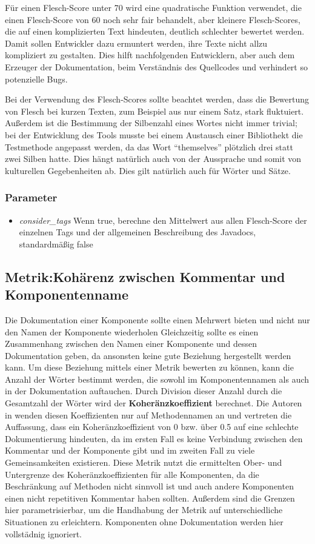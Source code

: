 Für einen Flesch-Score unter 70 wird eine quadratische Funktion verwendet, die einen Flesch-Score von 60 noch sehr fair behandelt, aber kleinere Flesch-Scores, die auf einen komplizierten Text hindeuten, deutlich schlechter bewertet werden. Damit sollen Entwickler dazu ermuntert werden, ihre Texte nicht allzu kompliziert zu gestalten. Dies hilft nachfolgenden Entwicklern, aber auch dem Erzeuger der Dokumentation, beim Verständnis des Quellcodes und verhindert so potenzielle Bugs.

Bei der Verwendung des Flesch-Scores sollte beachtet werden, dass die Bewertung von Flesch bei kurzen Texten, zum Beispiel aus nur einem Satz, stark fluktuiert. Außerdem ist die Bestimmung der Silbenzahl eines Wortes nicht immer trivial; bei der Entwicklung des Tools musste bei einem Austausch einer Bibliothekt die Testmethode angepasst werden, da das Wort \enquote{themselves} plötzlich drei statt zwei Silben hatte. Dies hängt natürlich auch von der Aussprache und somit von kulturellen Gegebenheiten ab. Dies gilt natürlich auch für Wörter und Sätze. 
\subsubsection{Parameter}
\begin{itemize}
    \item \textit{consider\_tags} Wenn true, berechne den Mittelwert aus allen Flesch-Score der einzelnen Tags und der allgemeinen Beschreibung des Javadocs, standardmäßig false
\end{itemize}
\subsection{Metrik:Kohärenz zwischen Kommentar und Komponentenname}\label{chapter:metrics_coherence}
Die Dokumentation einer Komponente sollte einen Mehrwert bieten und nicht nur den Namen der Komponente wiederholen  Gleichzeitig sollte es einen Zusammenhang zwischen den Namen einer Komponente und dessen Dokumentation geben, da ansonsten keine gute Beziehung hergestellt werden kann\cite[S. 86-87]{Qualityanalysisofsourcecodecomments}. Um diese Beziehung mittels einer Metrik bewerten zu können, kann die Anzahl der Wörter bestimmt werden, die sowohl im Komponentennamen als auch in der Dokumentation auftauchen. Durch Division dieser Anzahl durch die Gesamtzahl der Wörter wird der \textbf{Koheränzkoeffizient} berechnet. Die Autoren in \cite[S. 86-87]{Qualityanalysisofsourcecodecomments} wenden diesen Koeffizienten nur auf Methodennamen an und vertreten die Auffassung, dass ein Koheränzkoeffizient von 0 bzw. über 0.5 auf eine schlechte Dokumentierung hindeuten, da im ersten Fall es keine Verbindung zwischen den Kommentar und der Komponente gibt und im zweiten Fall zu viele Gemeinsamkeiten existieren. Diese Metrik nutzt die ermittelten Ober- und Untergrenze des Koheränzkoeffizienten für alle Komponenten, da die Beschränkung auf Methoden nicht sinnvoll ist und auch andere Komponenten einen nicht repetitiven Kommentar haben sollten. Außerdem sind die Grenzen hier parametrisierbar, um die Handhabung der Metrik auf unterschiedliche Situationen zu erleichtern. Komponenten ohne Dokumentation werden hier vollstädnig ignoriert. 


